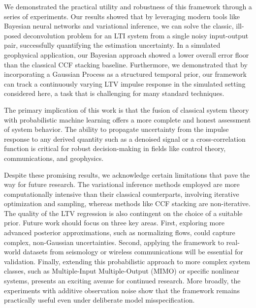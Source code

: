 \documentclass[preprint,1p,times,authoryear]{elsarticle}
\begin{document}
We demonstrated the practical utility and robustness of this framework through a series of experiments. Our results showed that by leveraging modern tools like Bayesian neural networks and variational inference, we can solve the classic, ill-posed deconvolution problem for an LTI system from a single noisy input-output pair, successfully quantifying the estimation uncertainty. In a simulated geophysical application, our Bayesian approach showed a lower overall error floor than the classical CCF stacking baseline. Furthermore, we demonstrated that by incorporating a Gaussian Process as a structured temporal prior, our framework can track a continuously varying LTV impulse response in the simulated setting considered here, a task that is challenging for many standard techniques.

The primary implication of this work is that the fusion of classical system theory with probabilistic machine learning offers a more complete and honest assessment of system behavior. The ability to propagate uncertainty from the impulse response to any derived quantity such as a denoised signal or a cross-correlation function is critical for robust decision-making in fields like control theory, communications, and geophysics.

Despite these promising results, we acknowledge certain limitations that pave the way for future research. The variational inference methods employed are more computationally intensive than their classical counterparts, involving iterative optimization and sampling, whereas methods like CCF stacking are non-iterative. The quality of the LTV regression is also contingent on the choice of a suitable prior. Future work should focus on three key areas. First, exploring more advanced posterior approximations, such as normalizing flows, could capture complex, non-Gaussian uncertainties. Second, applying the framework to real-world datasets from seismology or wireless communications will be essential for validation. Finally, extending this probabilistic approach to more complex system classes, such as Multiple-Input Multiple-Output (MIMO) or specific nonlinear systems, presents an exciting avenue for continued research. More broadly, the experiments with additive observation noise show that the framework remains practically useful even under deliberate model misspecification.





\clearpage
\end{document}
